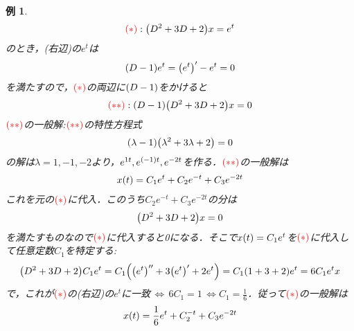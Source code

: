 \documentclass[autodetect-engine,dvipdfmx-if-dvi,ja=standard]{bxjsarticle}
\theoremstyle{mystyle1}
\theoremstyle{mystyle2}
\newtheorem{example}{例}
\newcommand{\redast}{\ensuremath{\color{red}\qty(\ast)\color{black}}}
\newcommand{\reddast}{\ensuremath{\color{red}\qty(\ast\ast)\color{black}}}
\begin{document}
\begin{example}
  \begin{align*}
    \redast:\qty(D^2+3D+2)x=e^t
  \end{align*}のとき，(右辺)の$e^t$は\begin{align*}
    \qty(D-1)e^t=\qty(e^t)^\prime -e^t=0
  \end{align*}を満たすので，\redast の両辺に$\qty(D-1)$をかけると\begin{align*}
    \reddast:\qty(D-1)\qty(D^2+3D+2)x=0
  \end{align*}
  \reddast の一般解:\reddast の特性方程式\begin{align*}
    \qty(\lambda-1)\qty(\lambda^2+3\lambda+2)=0
  \end{align*}の解は$\lambda=1,-1,-2$より，$e^{1t},e^{\qty(-1)t},e^{-2t}$を作る．\reddast の一般解は\begin{align*}
    x\qty(t)=C_1e^t+C_2e^{-t}+C_3e^{-2t}
  \end{align*}これを元の\redast に代入．このうち$C_2e^{-t}+C_3e^{-2t}$の分は\begin{align*}
    \qty(D^2+3D+2)x=0
  \end{align*}を満たすものなので\redast に代入すると0になる．そこで$x\qty(t)=C_1e^t$を\redast に代入して任意定数$C_1$を特定する:\begin{align*}
    \qty(D^2+3D+2)C_1e^t=C_1\qty(\qty(e^t)^{\prime\prime} +3\qty(e^t)^\prime +2e^t)=C_1\qty(1+3+2)e^t=6C_1e^tx
  \end{align*}で，これが\redast の(右辺)の$e^t$に一致\,$\Leftrightarrow\,6C_1=1\,\Leftrightarrow C_1=\frac{1}{6}$．従って\redast の一般解は\begin{align*}
    x\qty(t)=\frac{1}{6}e^t+C_2^{-t}+C_3e^{-2t}
  \end{align*}
\end{example}
\end{document}
